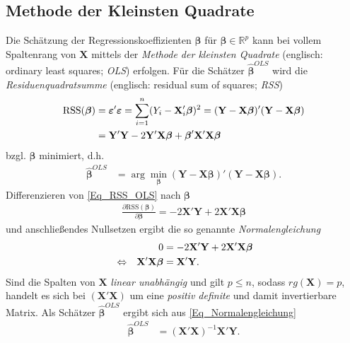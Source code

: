 \documentclass[12pt, a4paper]{report}\usepackage[]{graphicx}\usepackage[]{color}
\begin{document}
\subsection{Methode der Kleinsten Quadrate}\label{Kap_Methode der Kleinsten Quadrate}
Die Schätzung der Regressionskoeffizienten $\boldsymbol{\beta}$ für $\boldsymbol{\beta} \in \mathbb{R}^p$ kann bei vollem Spaltenrang von $\mathbf{X}$ mittels der \textit{Methode der kleinsten Quadrate} (englisch: ordinary least squares; \textit{OLS}) erfolgen. Für die Schätzer $\boldsymbol{\hat{\beta}}^{OLS}$ wird die \textit{Residuenquadratsumme} (englisch: residual sum of squares; \textit{RSS}) 
\begin{align}\label{Eq_RSS_OLS}
\text{RSS}(\boldsymbol{\beta})&=\boldsymbol{\varepsilon}'\boldsymbol{\varepsilon}=\sum_{i=1}^{n}(Y_i - \mathbf{X}_i'\boldsymbol{\beta})^2=(\mathbf{Y}-\mathbf{X}\boldsymbol{\beta})'(\mathbf{Y}-\mathbf{X}\boldsymbol{\beta}) \notag \\
&=\mathbf{Y}'\mathbf{Y} -2\mathbf{Y}'\mathbf{X}\boldsymbol{\beta}+\boldsymbol{\beta}'\mathbf{X}'\mathbf{X}\boldsymbol{\beta}
\end{align}
bzgl. $\boldsymbol{\beta}$ minimiert, d.h. 
\begin{align*}
\boldsymbol{\hat{\beta}}^{OLS}&=\arg \displaystyle\min_{\boldsymbol{\beta}} (\mathbf{Y}-\mathbf{X}\boldsymbol{\beta})'(\mathbf{Y}-\mathbf{X}\boldsymbol{\beta}).
\end{align*}
Differenzieren von \eqref{Eq_RSS_OLS} nach $\boldsymbol{\beta}$
\begin{align}\label{Eq_Ableitung_OLS}
\frac{\partial \text{RSS}(\boldsymbol{\beta})}{\partial  \boldsymbol{\beta}} = -2\mathbf{X}'\mathbf{Y} + 2\mathbf{X}'\mathbf{X}\boldsymbol{\beta}
\end{align}
und anschließendes Nullsetzen ergibt die so genannte \textit{Normalengleichung}
\begin{align}\label{Eq_Normalengleichung}
&& 0&=-2\mathbf{X}'\mathbf{Y} + 2\mathbf{X}'\mathbf{X}\boldsymbol{\beta} \notag \\
&\Leftrightarrow & \mathbf{X}'\mathbf{X}\boldsymbol{\beta}&= \mathbf{X}'\mathbf{Y}.
\end{align}
Sind die Spalten von $\mathbf{X}$ \textit{linear unabhängig} und gilt $p \le n$, sodass $rg(\mathbf{X})=p$, handelt es sich bei $(\mathbf{X}'\mathbf{X})$ um eine \textit{positiv definite} und damit invertierbare Matrix. Als Schätzer $\boldsymbol{\hat{\beta}}^{OLS}$ ergibt sich aus \eqref{Eq_Normalengleichung}
\begin{align}\label{Eq_OLS_Schätzer}
\boldsymbol{\hat{\beta}}^{OLS} &= (\mathbf{X}'\mathbf{X})^{-1}\mathbf{X}'\mathbf{Y}.
\end{align}
\end{document}
